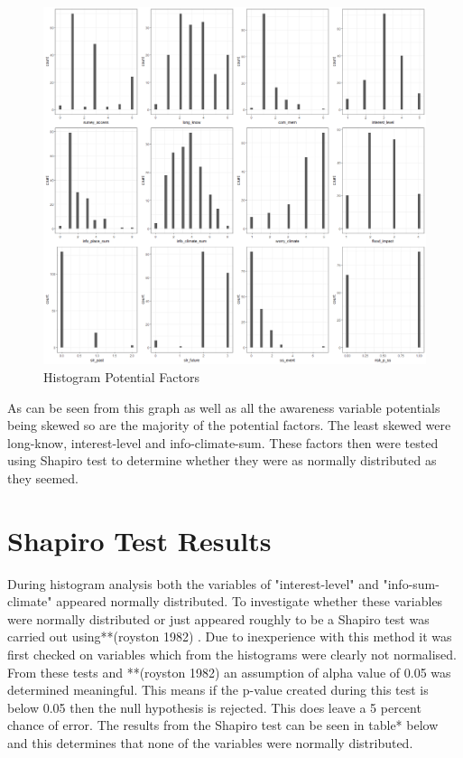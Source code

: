 \begin{figure}[h]
    \centering
    \includegraphics[width=1\textwidth]{fig_results/large_factors_all_histogram.png}
    \caption{Histogram Potential Factors}
    \label{fig:factors}
\end{figure}

As can be seen from this graph as well as all the awareness variable potentials being skewed so are the majority of the potential factors. The least skewed were long-know, interest-level and info-climate-sum. These factors then were tested using Shapiro test to determine whether they were as normally distributed as they seemed. 


\section{Shapiro Test Results}

During histogram analysis both the variables of "interest-level" and "info-sum-climate" appeared normally distributed. To investigate whether these variables were normally distributed or just appeared roughly to be a Shapiro test was carried out using**(royston 1982) . Due to inexperience with this method it was first checked on variables which from the histograms were clearly not normalised. From these tests and **(royston 1982) an assumption of alpha value of 0.05 was determined meaningful. This means if the p-value created during this test is below 0.05 then the null hypothesis is rejected. This does leave a 5 percent chance of error. The results from the Shapiro test can be seen in table* below and this determines that none of the variables were normally distributed. 

